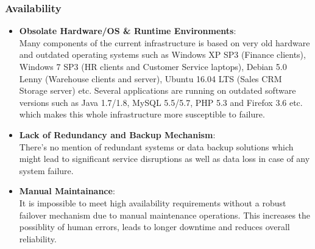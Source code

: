 \documentclass{llncs}
\begin{document}
\subsubsection*{Availability}
\begin{itemize}
  \item \textbf{Obsolate Hardware/OS \& Runtime Environments}: 
  \\
  Many components of the current infrastructure is based on very old hardware and outdated operating systems such as 
  Windows XP SP3 (Finance clients), Windows 7 SP3 (HR clients and Customer Service laptops), Debian 5.0 Lenny (Warehouse clients and server),
  Ubuntu 16.04 LTS (Sales CRM Storage server) etc. Several applications are running on outdated software versions such as Java 1.7/1.8, 
  MySQL 5.5/5.7, PHP 5.3 and Firefox 3.6 etc. which makes this whole infrastructure more susceptible to failure.
  \\
  \item \textbf{Lack of Redundancy and Backup Mechanism}:
  \\ 
  There's no mention of redundant systems or data backup solutions which might lead to significant service disruptions as well as data loss in case of any system failure.
  \\
  \item \textbf{Manual Maintainance}: 
  \\It is impossible to meet high availability requirements without a robust failover mechanism due to manual maintenance operations. 
  This increases the possiblity of human errors, leads to longer downtime and reduces overall reliability.
  \\
\end{itemize}
\end{document}
